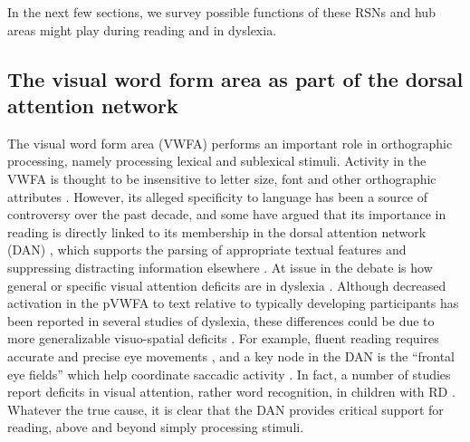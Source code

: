In the next few sections, we survey possible functions of these RSNs and hub areas might play during reading and in dyslexia.  

\subsection{The visual word form area as part of the dorsal attention network} 
The visual word form area (VWFA) performs an important role in orthographic processing, namely processing lexical and sublexical stimuli. Activity in the VWFA is thought to be insensitive to letter size, font and other orthographic attributes \citep{Cohen2002}. However, its alleged specificity to language has been a source of controversy over the past decade, and some have argued that its importance in reading is directly linked to its membership in the dorsal attention network (DAN) \citep{Vogel2012a}, which supports the parsing of appropriate textual features and suppressing distracting information elsewhere \citep{Corbetta2002}. At issue in the debate is how general or specific visual attention deficits are in dyslexia \citep{Vogel2014}. Although decreased activation in the pVWFA to text relative to typically developing participants has been reported in several studies of dyslexia, these differences could be due to more generalizable visuo-spatial deficits  \citep{Richlan2009}. For example, fluent reading requires accurate and precise eye movements \citep{Rayner1998}, and a key node in the DAN is the ``frontal eye fields'' which help coordinate saccadic activity \citep{Connolly2002}. In fact, a number of studies report deficits in visual attention, rather word recognition, in children with RD \citep{Vidyasagar2010}.  Whatever the true cause, it is clear that the DAN provides critical support for reading, above and beyond simply processing stimuli.

